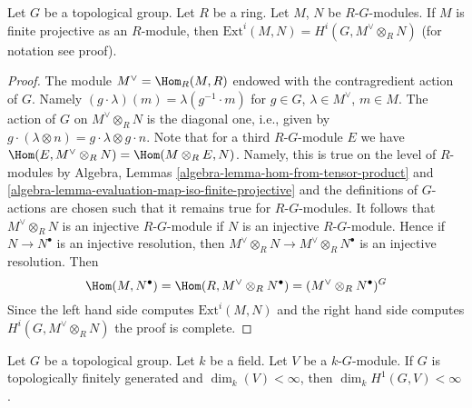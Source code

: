 \begin{lemma}
\label{lemma-ext-modules-hom}
Let $G$ be a topological group. Let $R$ be a ring.
Let $M$, $N$ be $R\text{-}G$-modules. If $M$ is finite projective
as an $R$-module, then
$\text{Ext}^i(M, N) = H^i(G, M^\vee \otimes_R N)$ (for notation
see proof).
\end{lemma}

\begin{proof}
The module $M^\vee = \Hom_R(M, R)$ endowed with the contragredient
action of $G$. Namely $(g \cdot \lambda)(m) = \lambda(g^{-1} \cdot m)$
for $g \in G$, $\lambda \in M^\vee$, $m \in M$. The action of $G$ on
$M^\vee \otimes_R N$ is the diagonal one, i.e., given by
$g \cdot (\lambda \otimes n) = g \cdot \lambda \otimes g \cdot n$.
Note that for a third $R\text{-}G$-module $E$ we have
$\Hom(E, M^\vee \otimes_R N) = \Hom(M \otimes_R E, N)$.
Namely, this is true on the level of $R$-modules by
Algebra, Lemmas \ref{algebra-lemma-hom-from-tensor-product} and
\ref{algebra-lemma-evaluation-map-iso-finite-projective}
and the definitions of $G$-actions are chosen such that it
remains true for $R\text{-}G$-modules. It follows that
$M^\vee \otimes_R N$ is an injective $R\text{-}G$-module
if $N$ is an injective $R\text{-}G$-module. Hence if
$N \to N^\bullet$ is an injective resolution, then
$M^\vee \otimes_R N \to M^\vee \otimes_R N^\bullet$
is an injective resolution. Then
$$
\Hom(M, N^\bullet) = \Hom(R, M^\vee \otimes_R N^\bullet) =
(M^\vee \otimes_R N^\bullet)^G
$$
Since the left hand side computes $\text{Ext}^i(M, N)$ and the right
hand side computes $H^i(G, M^\vee \otimes_R N)$ the proof is complete.
\end{proof}

\begin{lemma}
\label{lemma-finite-dim-group-cohomology}
Let $G$ be a topological group. Let $k$ be a field.
Let $V$ be a $k\text{-}G$-module.
If $G$ is topologically finitely generated and
$\dim_k(V) < \infty$, then $\dim_k H^1(G, V) < \infty$.
\end{lemma}

